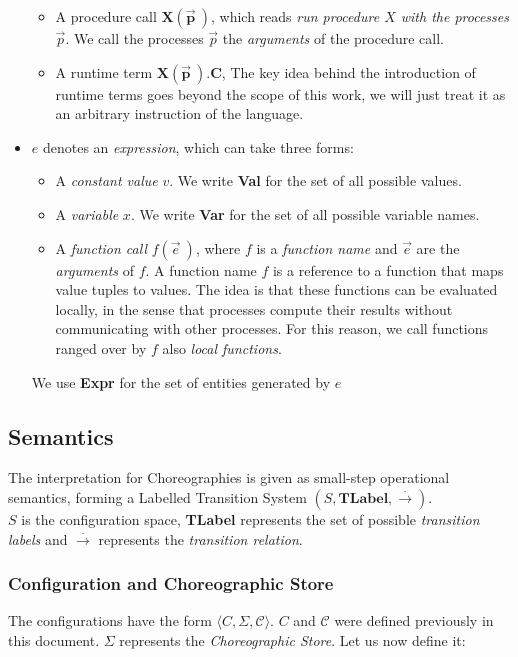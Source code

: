 \documentclass[12pt,a4paper,twoside]{book}
\begin{document}
\begin{itemize}
\begin{itemize}
	\item A procedure call $\bm{X(\vec{p}~)}$, which reads \textit{run procedure $X$ with the processes $\vec{p}$}. We call the processes $\vec{p}$ the \textit{arguments} of the procedure call.
	\item A runtime term $\bm{X(\vec{p}~).C}$, The key idea behind the introduction of runtime terms goes beyond the scope of this work, we will just treat it as an arbitrary instruction of the language.
\end{itemize}
\item $e$ denotes an \textit{expression}, which can take three forms:
\begin{itemize}
	\item A \emph{constant value} $v$. We write \textbf{Val} for the set of all possible values.
	\item A \emph{variable} $x$. We write \textbf{Var} for the set of all possible variable names.
	\item A \emph{function call} $f(\vec{e}~)$, where $f$ is a \emph{function name} and $\vec{e}$ are the \emph{arguments} of $f$.
A function name $f$ is a reference to a function that maps value tuples to values. The idea is that these functions can be evaluated locally, in the sense that processes compute their results without communicating with other processes. For this reason, we call functions ranged over by $f$ also \emph{local functions}.
\end{itemize} 
We use \textbf{Expr} for the set of entities generated by $e$
\end{itemize}

\subsection{Semantics}
The interpretation for Choreographies is given as small-step operational semantics\cite{plotkin2004origins}, forming a Labelled Transition System $(S,\textbf{TLabel},\xrightarrow{.})$.\\
$S$ is the configuration space, \textbf{TLabel} represents the set of possible \textit{transition labels} and $\xrightarrow{.}$ represents the \textit{transition relation}.
\subsubsection{Configuration and Choreographic Store}
The configurations have the form $\langle C, \Sigma, \mathscr{C} \rangle$.
$C$ and $\mathscr{C}$ were defined previously in this document.
$\Sigma$ represents the \textit{Choreographic Store}. Let us now define it:
\end{document}
